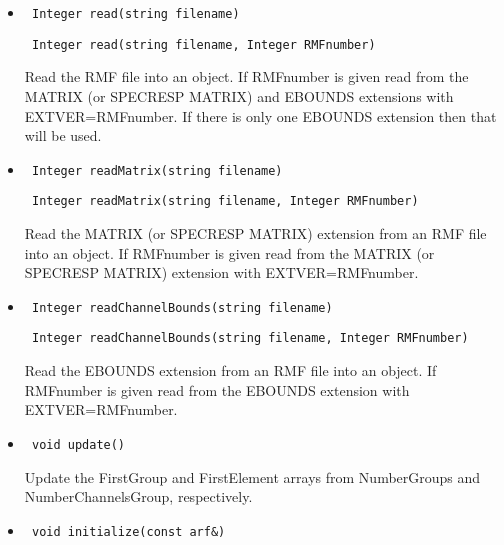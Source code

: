 \documentclass[11pt]{book}
\begin{document}
\begin{itemize}

\item  \begin{verbatim} Integer read(string filename) \end{verbatim}
       \begin{verbatim} Integer read(string filename, Integer RMFnumber) \end{verbatim}

          Read the RMF file into an object. If RMFnumber is given read
          from the MATRIX (or SPECRESP MATRIX) and EBOUNDS extensions 
          with EXTVER=RMFnumber. If there is only one EBOUNDS
          extension then that will be used.


\item  \begin{verbatim} Integer readMatrix(string filename) \end{verbatim}
       \begin{verbatim} Integer readMatrix(string filename, Integer RMFnumber) \end{verbatim}

          Read the MATRIX (or SPECRESP MATRIX) extension from an RMF 
          file into an object. If RMFnumber is given read from the 
          MATRIX (or SPECRESP MATRIX) extension with EXTVER=RMFnumber. 

\item  \begin{verbatim} Integer readChannelBounds(string filename) \end{verbatim}
       \begin{verbatim} Integer readChannelBounds(string filename, Integer RMFnumber) \end{verbatim}

          Read the EBOUNDS extension from an RMF file into an object. 
          If RMFnumber is given read from the EBOUNDS extension with 
          EXTVER=RMFnumber. 

\item  \begin{verbatim} void update() \end{verbatim}

          Update the FirstGroup and FirstElement arrays from
          NumberGroups and NumberChannelsGroup, respectively.

\item  \begin{verbatim} void initialize(const arf&) \end{verbatim}


\end{itemize}
\end{document}

